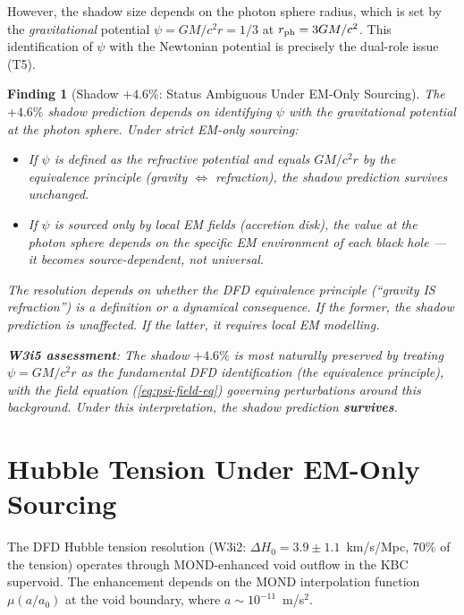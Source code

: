 \documentclass[11pt]{article}
\newtheorem{finding}{Finding}
\newcommand{\mufd}{\mu}
\begin{document}
However, the shadow size depends on the photon sphere radius, which is
set by the \emph{gravitational} potential $\psi = GM/c^2r = 1/3$ at
$r_{\rm ph} = 3GM/c^2$. This identification of $\psi$ with the Newtonian
potential is precisely the dual-role issue (T5).

\begin{finding}[Shadow $+4.6\%$: Status Ambiguous Under EM-Only Sourcing]
\label{find:shadow-EM}
The $+4.6\%$ shadow prediction depends on identifying $\psi$ with the
gravitational potential at the photon sphere. Under strict EM-only sourcing:
\begin{itemize}[nosep]
  \item If $\psi$ is \emph{defined} as the refractive potential and equals
    $GM/c^2r$ by the equivalence principle (gravity $\Leftrightarrow$
    refraction), the shadow prediction survives unchanged.
  \item If $\psi$ is sourced only by local EM fields (accretion disk), the
    value at the photon sphere depends on the specific EM environment of
    each black hole --- it becomes source-dependent, not universal.
\end{itemize}
The resolution depends on whether the DFD equivalence principle (``gravity
IS refraction'') is a definition or a dynamical consequence. If the former,
the shadow prediction is unaffected. If the latter, it requires local EM
modelling.

\textbf{W3i5 assessment}: The shadow $+4.6\%$ is most naturally preserved
by treating $\psi = GM/c^2r$ as the fundamental DFD identification (the
equivalence principle), with the field equation (\ref{eq:psi-field-eq})
governing \emph{perturbations} around this background. Under this
interpretation, the shadow prediction \textbf{survives}.
\end{finding}

\section{Hubble Tension Under EM-Only Sourcing}
\label{sec:hubble-EM}

The DFD Hubble tension resolution (W3i2: $\Delta H_0 = 3.9 \pm 1.1$~km/s/Mpc,
70\% of the tension) operates through MOND-enhanced void outflow in the
KBC supervoid. The enhancement depends on the MOND interpolation function
$\mufd(a/a_0)$ at the void boundary, where $a \sim 10^{-11}$~m/s$^2$.
\end{document}
